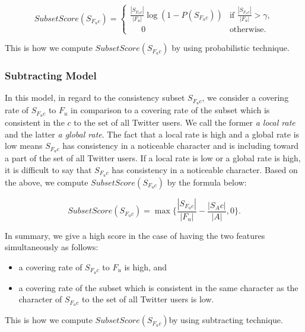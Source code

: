 \vspace{-1ex}
\[
  \displaystyle \mathit{SubsetScore}(S_{F_uc}) = \begin{cases}
    \displaystyle \frac{|S_{F_uc}|}{|F_u|} \log (1 - P(S_{F_uc})) &
    \mbox{if } \displaystyle \frac{|S_{F_uc}|}{|F_u|} > \gamma, \\
    \displaystyle \;\;\;\;\;0 & \mbox{otherwise.}
  \end{cases}
\]
\vspace{-2ex}

This is how we compute $\mathit{SubsetScore(S_{F_uc})}$ by using
probabilistic technique.

\subsubsection{Subtracting Model}
\label{subsubsec:Subtracting}

In this model, in regard to the consistency subset $S_{F_uc}$, we
consider a covering rate of $S_{F_uc}$ to $F_u$ in comparison to a
covering rate of the subset which is consistent in the $c$ to the set of
all Twitter users.  We call the former \emph{a local rate} and the
latter \emph{a global rate}.  The fact that a local rate is high and a
global rate is low means $S_{F_uc}$ has consistency in a noticeable
character and is including toward a part of the set of all Twitter
users.  If a local rate is low or a global rate is high, it is difficult
to say that $S_{F_uc}$ has consistency in a noticeable character.  Based
on the above, we compute $\mathit{SubsetScore(S_{F_uc})}$ by the formula
below:

\vspace{-1ex}
\[
 \mathit{SubsetScore}(S_{F_uc}) = \max \{\frac{|S_{F_uc}|}{|F_u|} -
 \frac{|S_Ac|}{|A|}, 0\}.
\]
\vspace{-2ex}

In summary, we give a high score in the case of having the two features
simultaneously as follows:

\begin{itemize}
\item a covering rate of $S_{F_uc}$ to $F_u$ is high, and
\item a covering rate of the subset which is consistent in the same
      character as the character of $S_{F_uc}$ to the set of all Twitter
      users is low.
\end{itemize}

This is how we compute $\mathit{SubsetScore(S_{F_uc})}$by using
subtracting technique.

